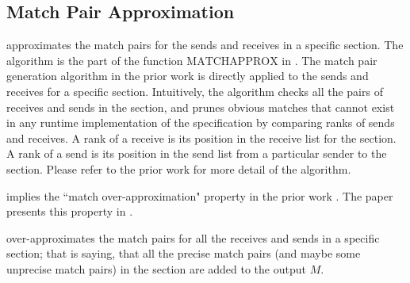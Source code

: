 \subsection{Match Pair Approximation}

 approximates the match pairs for the sends and receives in a specific section.
The algorithm is the part of the function $\mathrm{MATCHAPPROX}$ in . 
The match pair generation algorithm in the prior work \cite{DBLP:conf/kbse/HuangMM13} is directly applied to the sends and receives for a specific section. 
Intuitively, the algorithm checks all the pairs of receives and sends in the section, and prunes obvious matches that cannot exist in any runtime implementation of the specification by comparing ranks of sends and receives. 
A rank of a receive is its position in the receive list for the section. 
A rank of a send is its position in the send list from a particular sender to the section.    
Please refer to the prior work \cite{DBLP:conf/kbse/HuangMM13} for more detail of the algorithm. 


 implies the ``match over-approximation" property in the prior work \cite{DBLP:conf/kbse/HuangMM13}. The paper presents this property in . 

\begin{lemma}
 over-approximates the match pairs for all the receives and sends in a specific section; that is saying, that all the precise match pairs (and maybe some unprecise match pairs) in the section are added to the output $M$.
\label{lemma:match}
\end{lemma}



